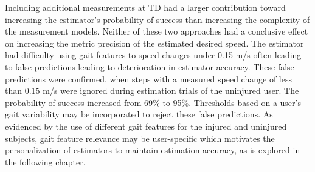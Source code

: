 Including additional measurements at TD had a larger contribution toward increasing the estimator's probability of success than increasing the complexity of the measurement models. Neither of these two approaches had a conclusive effect on increasing the metric precision of the estimated desired speed. The estimator had difficulty using gait features to speed changes under 0.15 m/s often leading to false predictions leading to deterioration in estimator accuracy. These false predictions were confirmed, when steps with a measured speed change of less than 0.15 m/s were ignored during estimation trials of the uninjured user. The probability of success increased from 69\% to 95\%. Thresholds based on a user's gait variability may be incorporated to reject these false predictions. As evidenced by the use of different gait features for the injured and uninjured subjects, gait feature relevance may be user-specific which motivates the personalization of estimators to maintain estimation accuracy, as is explored in the following chapter.